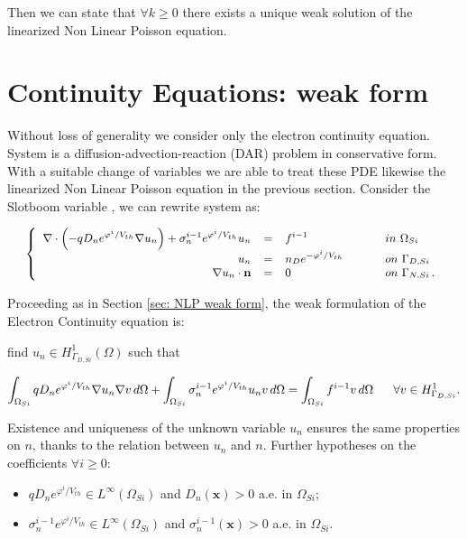 Then we can state that $\forall k \geq 0$ there exists a unique weak solution of the linearized Non Linear Poisson equation.

\section{Continuity Equations: weak form}
\label{sec: LEC weak}

Without loss of generality we consider only the electron continuity equation. System  is a diffusion-advection-reaction (DAR) problem in conservative form. With a suitable change of variables we are able to treat these PDE likewise the linearized Non Linear Poisson equation in the previous section. Consider the Slotboom variable , we can rewrite system  as:

\begin{equation}
\label{eq: system continuity equation}
\small
\left\{
\begin{array}{rcll}
 \nabla \cdot \left( - q D_n e^{\varphi^{i}/V_{th}}\nabla u_n \right) + \sigma_n^{i-1} e^{\varphi^{i}/V_{th}} u_n& = & f^{i-1}  & \psp{15} in \psp{2} \Omega_{Si} \\
u_n & = &  n_D e^{-\varphi^{i}/V_{th}} & \psp{15} on \psp{2} \Gamma_{D,Si} \\
\nabla u_n \cdot \vect{n} & = & 0 & \psp{15} on \psp{2} \Gamma_{N,Si} \, .
\end{array}
\right.
\end{equation}

Proceeding as in Section \ref{sec: NLP weak form}, the weak formulation of the Electron Continuity equation is: 

find $u_n \in H^1_{\Gamma_{D,Si}}(\Omega)$ such that

\begin{equation}
\footnotesize
\label{eq: LEC weakformulation}
\int_{\Omega_{Si}}  q D_n e^{\varphi^{i}/V_{th}} \nabla u_n \nabla v \, d\Omega + \int_{\Omega_{Si}} \sigma_n^{i-1} e^{\varphi^{i}/V_{th}} u_n v \, d\Omega = \int_{\Omega_{Si}} f^{i-1}v \, d\Omega \psp{10} \forall v \in H^1_{\Gamma_{D,Si}}.
\end{equation}


Existence and uniqueness of the unknown variable $u_n$ ensures the same properties on $n$, thanks to the relation  between $u_n$ and $n$.
Further hypotheses on the coefficients $\forall i\geq 0$:
\begin{itemize}
\item $q D_n e^{\varphi^{i}/V_{th}} \in L^{\infty}(\Omega_{Si})$ and $D_n(\mathbf{x})>0$ a.e. in $\Omega_{Si}$;
\item  $\sigma_n^{i-1} e^{\varphi^i/V_{th}} \in L^{\infty}(\Omega_{Si})$ and $\sigma_n^{i-1}(\mathbf{x})>0$ a.e. in $\Omega_{Si}$.
\end{itemize}

